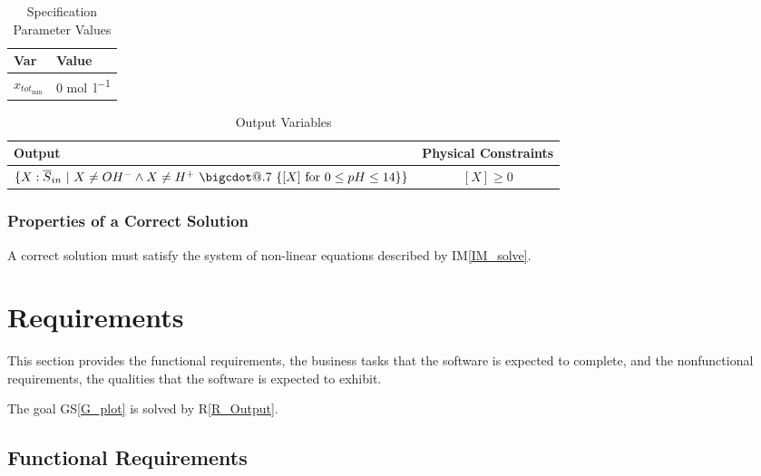 \documentclass[12pt]{article}
\makeatletter
\newcommand*\bigcdot{\mathpalette\bigcdot@{.7}}
\newcommand*\bigcdot@[2]
  {\mathbin{\vcenter{\hbox{\scalebox{#2}{$\m@th#1\bullet$}}}}}
\newcommand{\gsref}[1]{GS\ref{#1}}
\newcommand{\iref}[1]{IM\ref{#1}}
\newcommand{\rref}[1]{R\ref{#1}}
\makeatother
\begin{document}
\begin{table}[!h]
\centering
\caption{Specification Parameter Values} \label{TblSpecParams}
\renewcommand{\arraystretch}{1.2}
\noindent \begin{tabular}{l l} 
  \toprule
  \textbf{Var} & \textbf{Value} \\
  \midrule 
  $x_{{tot}_{\text{min}}}$ & 0 \si{\mole\per\litre}\\
  \bottomrule
\end{tabular}
\end{table}

\begin{table}[!h]
\centering
\caption{Output Variables} \label{TblOutputVar}
\renewcommand{\arraystretch}{1.2}
\noindent \begin{tabular}{l c} 
  \toprule
  \textbf{Output} & \textbf{Physical Constraints} \\
  \midrule 
  $\{X:\overline S_{in} ~|~ X \neq OH^- \land X \neq H^+ ~\bigcdot~ 
    \{[X]~\textrm{for}~0 \leq pH \leq 14\} \}$ & $[X] \geq 0$
  \\
  \bottomrule
\end{tabular}
\end{table}

\subsubsection{Properties of a Correct Solution} \label{sec_CorrectSolution}

\noindent
A correct solution must satisfy the system of non-linear equations described by 
\iref{IM_solve}. 

\section{Requirements}

This section provides the functional requirements, the business tasks that the
software is expected to complete, and the nonfunctional requirements, the
qualities that the software is expected to exhibit.

The goal \gsref{G_plot} is solved by \rref{R_Output}.

\subsection{Functional Requirements}
\end{document}
